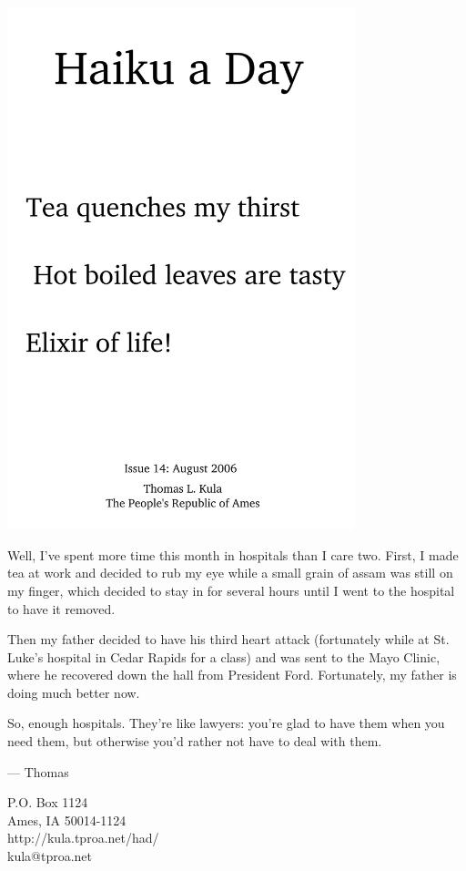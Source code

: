\documentclass[12pt]{article}
\begin{document}
\includegraphics[width=101mm]{frontpage.png}

\newpage

Well, I've spent more time this month in hospitals
than I care two. First, I made tea at work and 
decided to rub my eye while a small grain of 
assam was still on my finger, which decided to stay
in for several hours until I went to the hospital
to have it removed.

Then my father decided to have his third heart
attack (fortunately while at St. Luke's hospital
in Cedar Rapids for a class) and was sent to the
Mayo Clinic, where he recovered down the hall 
from President Ford. Fortunately, my father is
doing much better now.

So, enough hospitals. They're like lawyers: you're
glad to have them when you need them, but otherwise
you'd rather not have to deal with them.

--- Thomas

P.O. Box 1124 \\
Ames, IA 50014-1124 \\
http://kula.tproa.net/had/ \\
kula@tproa.net
\end{document}
